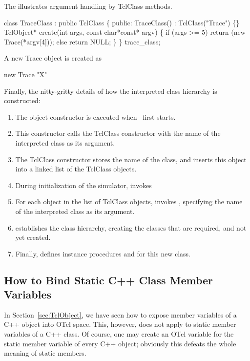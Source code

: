 The  illustrates
argument handling by TclClass methods.
\begin{program}
        class TraceClass : public TclClass \{
        public:
                TraceClass() : TclClass("Trace") \{\}
                TclObject* create(int args, const char*const* argv) \{
                        if (args >= 5)
                                return (new Trace(*argv[4]));
                        else
                                return NULL;
                \}
        \} trace_class;
\end{program}
A new Trace object is created as
\begin{program}
        new Trace "X"
\end{program}
Finally, the nitty-gritty details of how the 
interpreted class hierarchy is constructed:
\begin{enumerate}
\item The object constructor is executed when \ns\ first starts.
\item This constructor calls the TclClass constructor
  with the name of the interpreted class as its argument.
\item The TclClass constructor stores the name of the class,
  and inserts this object into a linked list of the TclClass objects.
\item During initialization of the simulator,
  invokes 
\item For each object in the list of TclClass objects,
   invokes 
  ,
  specifying the name of the interpreted class as its argument.
\item {} establishes the class hierarchy,
  creating the classes that are required, and not yet created.
\item Finally,  defines instance procedures
   and  for this new class.
\end{enumerate}

\subsection{How to Bind Static C++ Class Member Variables}

In Section~\ref{sec:TclObject}, we have seen how to expose member
variables of a C++ object into OTcl space. 
This, however, does not apply to static member variables of a C++
class. 
Of course, one may create an OTcl variable for the static member
variable of every C++ object; obviously this defeats the whole meaning
of static members.

